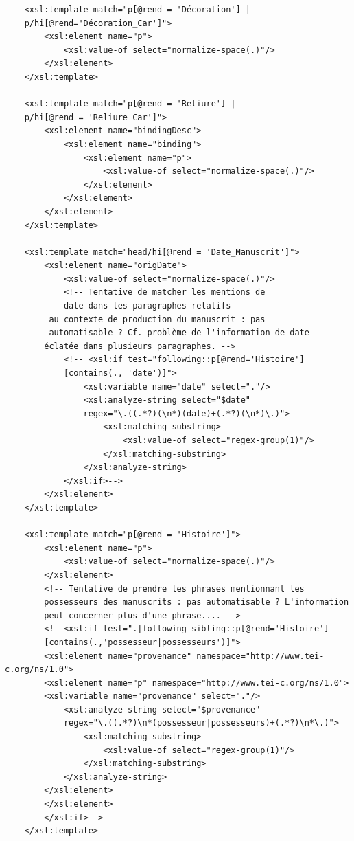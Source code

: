 \documentclass[a4paper,12pt,twoside]{book}
\begin{document}
\begin{verbatim}
    <xsl:template match="p[@rend = 'Décoration'] | 
    p/hi[@rend='Décoration_Car']">
        <xsl:element name="p">
            <xsl:value-of select="normalize-space(.)"/>
        </xsl:element>
    </xsl:template>

    <xsl:template match="p[@rend = 'Reliure'] | 
    p/hi[@rend = 'Reliure_Car']">
        <xsl:element name="bindingDesc">
            <xsl:element name="binding">
                <xsl:element name="p">
                    <xsl:value-of select="normalize-space(.)"/>
                </xsl:element>
            </xsl:element>
        </xsl:element>
    </xsl:template>

    <xsl:template match="head/hi[@rend = 'Date_Manuscrit']">
        <xsl:element name="origDate">
            <xsl:value-of select="normalize-space(.)"/>
            <!-- Tentative de matcher les mentions de 
            date dans les paragraphes relatifs 
         au contexte de production du manuscrit : pas 
         automatisable ? Cf. problème de l'information de date 
        éclatée dans plusieurs paragraphes. -->
            <!-- <xsl:if test="following::p[@rend='Histoire']
            [contains(., 'date')]">
                <xsl:variable name="date" select="."/>
                <xsl:analyze-string select="$date" 
                regex="\.((.*?)(\n*)(date)+(.*?)(\n*)\.)">
                    <xsl:matching-substring>
                        <xsl:value-of select="regex-group(1)"/>
                    </xsl:matching-substring>
                </xsl:analyze-string>
            </xsl:if>-->
        </xsl:element>
    </xsl:template>

    <xsl:template match="p[@rend = 'Histoire']">
        <xsl:element name="p">
            <xsl:value-of select="normalize-space(.)"/>
        </xsl:element>
        <!-- Tentative de prendre les phrases mentionnant les 
        possesseurs des manuscrits : pas automatisable ? L'information 
        peut concerner plus d'une phrase.... -->
        <!--<xsl:if test=".|following-sibling::p[@rend='Histoire']
        [contains(.,'possesseur|possesseurs')]">
        <xsl:element name="provenance" namespace="http://www.tei-c.org/ns/1.0">
        <xsl:element name="p" namespace="http://www.tei-c.org/ns/1.0">
        <xsl:variable name="provenance" select="."/>
            <xsl:analyze-string select="$provenance" 
            regex="\.((.*?)\n*(possesseur|possesseurs)+(.*?)\n*\.)">
                <xsl:matching-substring>
                    <xsl:value-of select="regex-group(1)"/>
                </xsl:matching-substring>
            </xsl:analyze-string>
        </xsl:element>
        </xsl:element>
        </xsl:if>-->
    </xsl:template>


\end{verbatim}
\end{document}
